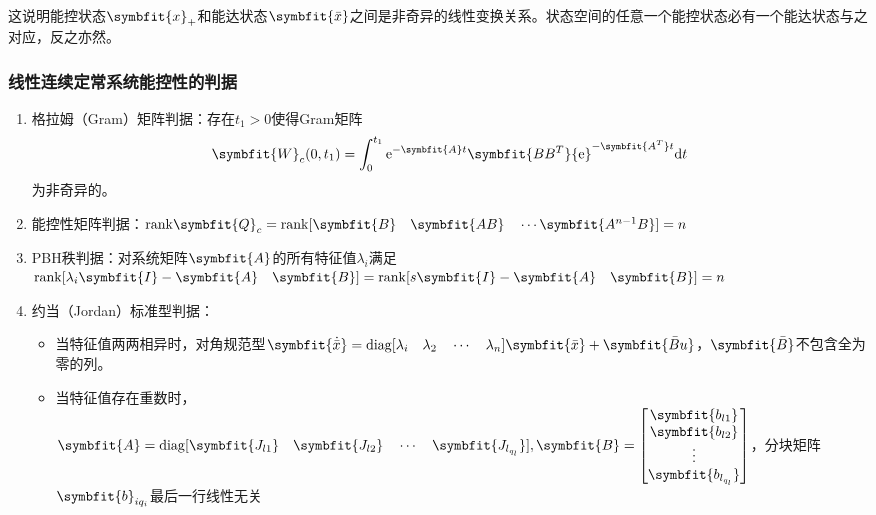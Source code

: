 \documentclass[11pt,a4paper]{ctexart}
\renewcommand{\d}{{\rm d}}
\newcommand{\e}{{\rm e}}
\newcommand{\bm}{\symbfit}
\begin{document}
            这说明能控状态$\bm{x}_{+}$和能达状态$\bm{\bar x}$之间是非奇异的线性变换关系。状态空间的任意一个能控状态必有一个能达状态与之对应，反之亦然。
        \subsubsection{线性连续定常系统能控性的判据}
            \begin{enumerate}
                \item 格拉姆（Gram）矩阵判据：存在$t_1>0$使得Gram矩阵
                \[
                \bm{W}_c(0,t_1)=\int_{0}^{t_1}\e^{-\bm{A}t}\bm{BB^T}\e^{-\bm{A^T}t}\d t
                \]
                为非奇异的。
                \item 能控性矩阵判据：${\rm rank}\bm{Q}_c={\rm rank}[\bm{B}\quad\bm{AB}\quad\cdots\bm{A^{n-1}B}]=n$
                \item PBH秩判据：对系统矩阵$\bm{A}$的所有特征值$\lambda_i$满足${\rm rank}[\lambda_i\bm{I}-\bm{A}\quad\bm{B}]={\rm rank}[s\bm{I}-\bm{A}\quad\bm{B}]=n$
                \item 约当（Jordan）标准型判据：
                \begin{itemize}
                    \item 当特征值两两相异时，对角规范型$\bm{\dot{\bar x}}={\rm diag}[\lambda_i\quad\lambda_2\quad\cdots\quad\lambda_n]\bm{\bar x}+\bm{\bar Bu}$，$\bm{\bar B}$不包含全为零的列。
                    \item 当特征值存在重数时，$\bm{A}={\rm diag}[\bm{J_{l1}}\quad\bm{J_{l2}}\quad\cdots\quad\bm{J_{l_{q_l}}}],
                    \bm{B}=\begin{bmatrix}\bm{b_{l1}}\\ \bm{b_{l2}}\\ \vdots\\ \bm{b_{l_{q_l}}}\end{bmatrix}$，分块矩阵$\bm{b}_{iq_i}$最后一行线性无关
                \end{itemize}
            \end{enumerate}
\end{document}
